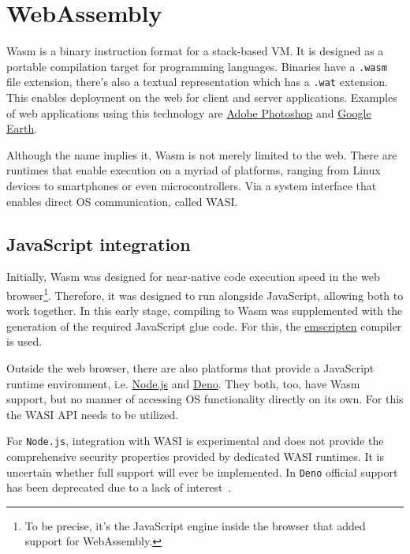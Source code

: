 \section{WebAssembly}
\label{chap:wasm}

\gls{Wasm} is a binary instruction format for a stack-based \gls{VM}. It is designed as a portable compilation target for programming languages. Binaries have a \texttt{.wasm} file extension, there's also a textual representation which has a \texttt{.wat} extension. This enables deployment on the web for client and server applications. Examples of web applications using this technology are \href{https://photoshop.adobe.com/}{Adobe Photoshop} and \href{https://earth.google.com/web}{Google Earth}.

Although the name implies it, \gls{Wasm} is not merely limited to the web. There are runtimes that enable execution on a myriad of platforms, ranging from Linux devices to smartphones or even microcontrollers. Via a system interface that enables direct \gls{OS} communication, called \gls{WASI}.

\subsection{JavaScript integration}

Initially, \gls{Wasm} was designed for near-native code execution speed in the web browser\footnote{To be precise, it's the JavaScript engine inside the browser that added support for WebAssembly.}. Therefore, it was designed to run alongside JavaScript, allowing both to work together. In this early stage, compiling to \gls{Wasm} was supplemented with the generation of the required JavaScript glue code. For this, the \href{https://emscripten.org/index.html}{emscripten} compiler is used.

Outside the web browser, there are also platforms that provide a JavaScript runtime environment, i.e. \href{https://nodejs.org/en}{Node.js} and \href{https://deno.com/}{Deno}. They both, too, have \gls{Wasm} support, but no manner of accessing \gls{OS} functionality directly on its own. For this the \gls{WASI} \gls{API} needs to be utilized.

For \texttt{Node.js}, integration with \gls{WASI} is experimental and does not provide the comprehensive security properties provided by dedicated \gls{WASI} runtimes. It is uncertain whether full support will ever be implemented. In \texttt{Deno} official support has been deprecated due to a lack of interest~\cite{deno:wasi}.
